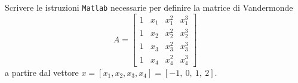 Scrivere le istruzioni {\tt Matlab} necessarie per definire la matrice di Vandermonde
\[
A=\left[ \begin{array}{cccc}1 & x_1 & x_1^2 & x_1^3 \\
1 & x_2 & x_2^2 & x_2^3 \\
1 & x_3 & x_3^2 & x_3^3 \\
1 & x_4 & x_4^2 & x_4^3 \end{array} \right]
\]
a partire dal vettore $x= [x_1, x_2, x_3, x_4]=
[-1, \ 0, \ 1, \ 2].$ 


